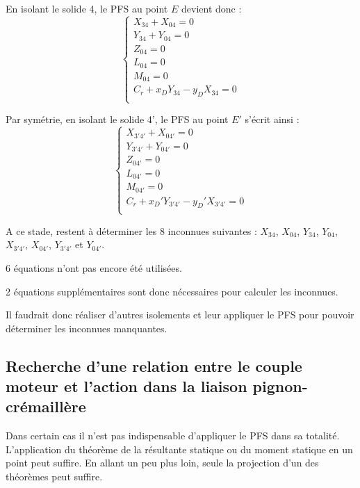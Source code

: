 \documentclass[11pt,oneside]{article}
\begin{document}
\vspace{.5cm}
\begin{minipage}[c]{.45\linewidth}
En isolant le solide 4, le PFS au point $E$ devient donc : 
$$
\left\{
\begin{array}{l}
{X_{34}}+{X_{04}}=0 \\
{Y_{34}}+{Y_{04}}=0 \\
{Z_{04}}=0 \\
{L_{04}}=0\\
{M_{04}}=0\\
{C_r}+{x_DY_{34}-y_DX_{34}}=0 \\
\end{array}
\right.
$$

\end{minipage} \hfill
\begin{minipage}[c]{.45\linewidth}
Par symétrie, en isolant le solide 4', le PFS au point $E'$ s'écrit ainsi : 
$$
\left\{
\begin{array}{l}
{X_{3'4'}}+{X_{04'}}=0 \\
{Y_{3'4'}}+{Y_{04'}}=0 \\
{Z_{04'}}=0 \\
{L_{04'}}=0\\
{M_{04'}}=0\\
{C_r}+{x_D'Y_{3'4'}-y_D'X_{3'4'}}=0 \\
\end{array}
\right.
$$

\end{minipage}


\begin{rem}
A ce stade, restent à déterminer les 8 inconnues suivantes : $X_{34}$, $X_{04}$, $Y_{34}$, $Y_{04}$, $X_{3'4'}$, $X_{04'}$, $Y_{3'4'}$ et $Y_{04'}$.

6 équations n'ont pas encore été utilisées.

2 équations supplémentaires sont donc nécessaires pour calculer les inconnues. 

Il faudrait donc réaliser d'autres isolements et leur appliquer le PFS pour pouvoir déterminer les inconnues manquantes.
\end{rem}



\subsection{Recherche d'une relation entre le couple moteur et l'action dans la liaison pignon-crémaillère}

Dans certain cas il n'est pas indispensable d'appliquer le PFS dans sa totalité. L'application du théorème de la résultante statique ou du moment statique en un point peut suffire. En allant un peu plus loin, seule la projection d'un des théorèmes peut suffire.
\end{document}

